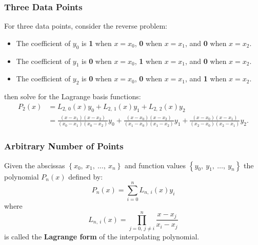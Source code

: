 \documentclass{article}
\begin{document}
\subsubsection{Three Data Points}
For three data points, consider the reverse problem:
\begin{itemize}
    \item The coefficient of \(y_0\) is \textbf{1} when \(x = x_0\), \textbf{0} when \(x = x_1\), and \textbf{0} when \(x = x_2\).
    \item The coefficient of \(y_1\) is \textbf{0} when \(x = x_0\), \textbf{1} when \(x = x_1\), and \textbf{0} when \(x = x_2\).
    \item The coefficient of \(y_2\) is \textbf{0} when \(x = x_0\), \textbf{0} when \(x = x_1\), and \textbf{1} when \(x = x_2\).
\end{itemize}
then solve for the Lagrange basis functions:
\begin{align*}
    P_2\left( x \right) & = L_{2,\: 0}\left( x \right) y_0 + L_{2,\: 1}\left( x \right) y_1 + L_{2,\: 2}\left( x \right) y_2                                                                                                                                                                                                                                   \\
                        & = \frac{\left( x - x_1 \right)\left( x - x_2 \right)}{\left( x_0 - x_1 \right)\left( x_0 - x_2 \right)} y_0 + \frac{\left( x - x_0 \right)\left( x - x_2 \right)}{\left( x_1 - x_0 \right)\left( x_1 - x_2 \right)} y_1 + \frac{\left( x - x_0 \right)\left( x - x_1 \right)}{\left( x_2 - x_0 \right)\left( x_2 - x_1 \right)} y_2.
\end{align*}
\subsubsection{Arbitrary Number of Points}
Given the abscissas \(\left\{ x_0,\: x_1,\: \dots,\: x_n \right\}\) and function values
\(\left\{ y_0,\: y_1,\: \dots,\: y_n \right\}\) the polynomial \(P_n\left( x \right)\) defined by:
\begin{equation*}
    P_n\left( x \right) = \sum_{i = 0}^n L_{n,\: i}\left( x \right) y_i
\end{equation*}
where
\begin{equation*}
    L_{n,\: i}\left( x \right) = \prod_{j = 0,\: j \neq i}^n \frac{x - x_j}{x_i - x_j}
\end{equation*}
is called the \textbf{Lagrange form} of the interpolating polynomial.
\end{document}

